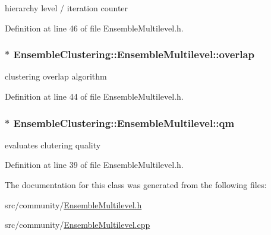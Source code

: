 hierarchy level / iteration counter 



Definition at line 46 of file Ensemble\-Multilevel.\-h.

\hypertarget{class_ensemble_clustering_1_1_ensemble_multilevel_a14fc679b06a378edbda2fe0b77c831b0}{
\subsubsection[{overlap}]{$\ast$ Ensemble\-Clustering\-::\-Ensemble\-Multilevel\-::overlap\hspace{0.3cm}{\ttfamily [protected]}}}\label{class_ensemble_clustering_1_1_ensemble_multilevel_a14fc679b06a378edbda2fe0b77c831b0}


clustering overlap algorithm 



Definition at line 44 of file Ensemble\-Multilevel.\-h.

\hypertarget{class_ensemble_clustering_1_1_ensemble_multilevel_a15b2fa011c34bb8c2ea0125b22530eb0}{
\subsubsection[{qm}]{$\ast$ Ensemble\-Clustering\-::\-Ensemble\-Multilevel\-::qm\hspace{0.3cm}{\ttfamily [protected]}}}\label{class_ensemble_clustering_1_1_ensemble_multilevel_a15b2fa011c34bb8c2ea0125b22530eb0}


evaluates clutering quality 



Definition at line 39 of file Ensemble\-Multilevel.\-h.



The documentation for this class was generated from the following files\-:\begin{DoxyCompactItemize}
\item 
src/community/\hyperlink{_ensemble_multilevel_8h}{Ensemble\-Multilevel.\-h}\item 
src/community/\hyperlink{_ensemble_multilevel_8cpp}{Ensemble\-Multilevel.\-cpp}\end{DoxyCompactItemize}
